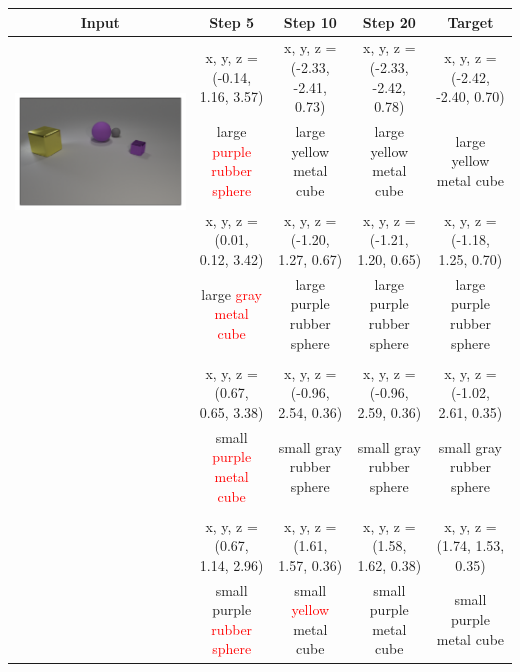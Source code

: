\documentclass[a0paper, landscape, 25pt]{tikzposter}
\begin{document}
\begin{columns}
{            \vspace{0.5cm}
            \begin{minipage}{0.75\linewidth}
                \scriptsize
                \setlength{\tabcolsep}{1.4mm}
                \begin{tabular}{ccccc}
                    \normalsize Input & \normalsize Step 5 & \normalsize Step 10 & \normalsize Step 20 & \normalsize Target\\
                    \midrule
                    \multirow{4}{*}{\includegraphics[width=0.36\linewidth, trim={0 0 8mm 0}, clip]{resources/img-0}}
                    & x, y, z = (-0.14, 1.16, 3.57) & x, y, z = (-2.33, -2.41, 0.73) & x, y, z = (-2.33, -2.42, 0.78) & x, y, z = (-2.42, -2.40, 0.70) \\
                    & large \textcolor{red}{purple} \textcolor{red}{rubber} \textcolor{red}{sphere} & large yellow metal cube & large yellow metal cube & large yellow metal cube \\\\
                    & x, y, z = (0.01, 0.12, 3.42) & x, y, z = (-1.20, 1.27, 0.67) & x, y, z = (-1.21, 1.20, 0.65) & x, y, z = (-1.18, 1.25, 0.70)\\
                    & large \textcolor{red}{gray} \textcolor{red}{metal} \textcolor{red}{cube} & large purple rubber sphere & large purple rubber sphere & large purple rubber sphere \\\\
                    & x, y, z = (0.67, 0.65, 3.38) & x, y, z = (-0.96, 2.54, 0.36) & x, y, z = (-0.96, 2.59, 0.36) & x, y, z = (-1.02, 2.61, 0.35)\\
                    & small \textcolor{red}{purple} \textcolor{red}{metal} \textcolor{red}{cube} & small gray rubber sphere & small gray rubber sphere & small gray rubber sphere \\\\
                    & x, y, z = (0.67, 1.14, 2.96) & x, y, z = (1.61, 1.57, 0.36) & x, y, z = (1.58, 1.62, 0.38) & x, y, z = (1.74, 1.53, 0.35)\\
                    & small purple \textcolor{red}{rubber} \textcolor{red}{sphere} & small \textcolor{red}{yellow} metal cube & small purple metal cube & small purple metal cube \\
                \end{tabular}

            \end{minipage}

        }


    \end{columns}
\end{document}
